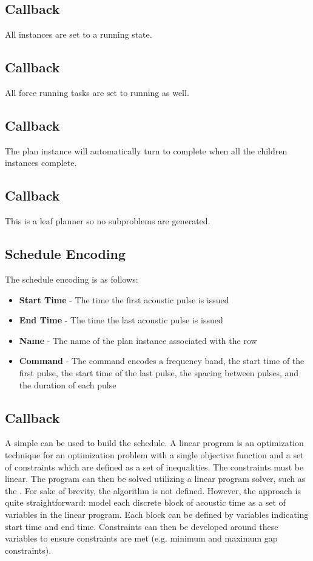 \subsection{Callback }
All instances are set to a running state.

\subsection{Callback }
All force running tasks are set to running as well.

\subsection{Callback }
The plan instance will automatically turn to complete when all the  children instances complete.

\subsection{Callback }
This is a leaf planner so no subproblems are generated.

\subsection{Schedule Encoding}
The schedule encoding is as follows:
\begin{itemize}
\item \textbf{Start Time} - The time the first acoustic pulse is issued
\item \textbf{End Time} - The time the last acoustic pulse is issued
\item \textbf{Name} - The name of the  plan instance associated with the row
\item \textbf{Command} - The command encodes a frequency band, the start time of the first pulse, the start time of the last pulse, the spacing between pulses, and the duration of each pulse
\end{itemize}

\subsection{Callback }
A simple  can be used to build the schedule. A linear program is an optimization technique for an optimization problem with a single objective function and a set of constraints which are defined as a set of inequalities. The constraints must be linear. The program can then be solved utilizing a linear program solver, such as the . For sake of brevity, the algorithm is not defined. However, the approach is quite straightforward: model each discrete block of acoustic time as a set of variables in the linear program. Each block can be defined by variables indicating start time and end time. Constraints can then be developed around these variables to ensure constraints are met (e.g. minimum and maximum gap constraints). 

